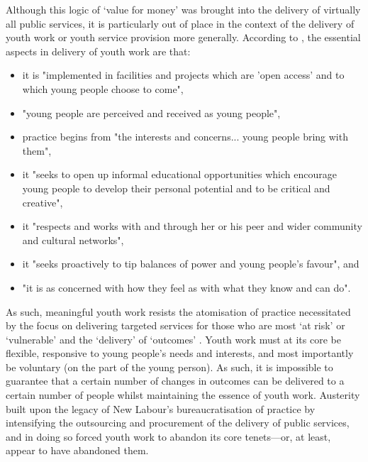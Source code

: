 Although this logic of `value for money' was brought into the delivery of virtually all public services, it is particularly out of place in the context of the delivery of youth work or youth service provision more generally. According to \citet[p. 11]{davies_austerity_2018}, the essential aspects in  delivery of youth work are that: 
\begin{itemize}
    \item it is "implemented in facilities and projects which are 'open access' and to which young people choose to come",
    \item "young people are perceived and received as young people",
    \item practice begins from "the interests and concerns... young people bring with them",
    \item it "seeks to open up informal educational opportunities which encourage young people to develop their personal potential and to be critical and creative",
    \item it "respects and works with and through her or his peer and wider community and cultural networks",
    \item it "seeks proactively to tip balances of power and young people's favour", and
    \item "it is as concerned with how they feel as with what they know and can do". 
\end{itemize}
As such, meaningful youth work resists the atomisation of practice necessitated by the focus on delivering targeted services for those who are most `at risk' or `vulnerable' \citep[p. 25]{davies_austerity_2018} and the `delivery' of `outcomes' \citep[p. 32]{davies_austerity_2018}. Youth work must at its core be flexible, responsive to young people's needs and interests, and most importantly be voluntary (on the part of the young person). As such, it is impossible to guarantee that a certain number of changes in outcomes can be delivered to a certain number of people whilst maintaining the essence of youth work. Austerity built upon the legacy of New Labour's bureaucratisation of practice by intensifying the outsourcing and procurement of the delivery of public services, and in doing so forced youth work to abandon its core tenets—or, at least, appear to have abandoned them. 

